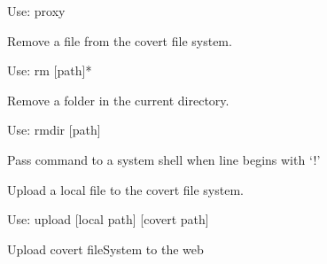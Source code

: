 \documentclass[letterpaper,12pt,openany,oneside]{sphinxmanual}
\begin{document}
\begin{fulllineitems}
\begin{fulllineitems}
Use: proxy

\end{fulllineitems}


\begin{fulllineitems}
\label{main:main.Console.do_rm}
Remove a file from the covert file system.

Use: rm {[}path{]}*

\end{fulllineitems}


\begin{fulllineitems}
\label{main:main.Console.do_rmdir}
Remove a folder in the current directory.

Use: rmdir {[}path{]}

\end{fulllineitems}


\begin{fulllineitems}
\label{main:main.Console.do_shell}
Pass command to a system shell when line begins with `!'

\end{fulllineitems}


\begin{fulllineitems}
\label{main:main.Console.do_upload}
Upload a local file to the covert file system.

Use: upload {[}local path{]} {[}covert path{]}

\end{fulllineitems}


\begin{fulllineitems}
\label{main:main.Console.do_uploadfs}
Upload covert fileSystem to the web

\end{fulllineitems}



\end{fulllineitems}
\end{document}
